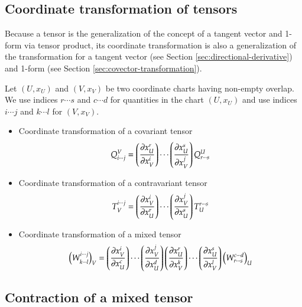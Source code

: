 \documentclass[11pt, a4paper]{book}
\begin{document}
\subsection{Coordinate transformation of tensors}

Because a tensor is the generalization of the concept of a tangent vector and 1-form via
tensor product, its coordinate transformation is also a generalization of the
transformation for a tangent vector (see Section \ref{sec:directional-derivative}) and
1-form (see Section \ref{sec:covector-transformation}).

Let $(U,x_U)$ and $(V,x_V)$ be two coordinate charts having non-empty overlap. We use
indices $r\cdots s$ and $c\cdots d$ for quantities in the chart $(U,x_U)$ and use indices
$i\cdots j$ and $k\cdots l$ for $(V,x_V)$.
\begin{itemize}
\item Coordinate transformation of a covariant tensor
  \begin{equation}
    \label{eq:covariant-tensor-transform}
    Q_{i\cdots j}^V = \left( \frac{\partial x_U^r}{\partial x_V^i} \right) \cdots \left(
      \frac{\partial x_U^s}{\partial x_V^j} \right) Q_{r \cdots s}^U
  \end{equation}
\item Coordinate transformation of a contravariant tensor
  \begin{equation}
    \label{eq:contravariant-tensor-transform}
    T_V^{i \cdots j} = \left( \frac{\partial x_V^i}{\partial x_U^r} \right) \cdots \left(
      \frac{\partial x_V^j}{\partial x_U^s} \right) T_U^{r \cdots s}
  \end{equation}
\item Coordinate transformation of a mixed tensor
  \begin{equation}
    \label{eq:mixed-tensor-transform}
    \left( W^{i \cdots j}_{k \cdots l} \right)_V = \left( \frac{\partial x_V^i}{\partial x_U^c} \right)
    \cdots \left( \frac{\partial x_V^j}{\partial x_U^d} \right) \left( \frac{\partial
        x_U^r}{\partial x_V^k} \right) \cdots \left( \frac{\partial x_U^s}{\partial x_V^l}
    \right) \left( W^{c \cdots d}_{r \cdots s} \right)_U
  \end{equation}
\end{itemize}

\subsection{Contraction of a mixed tensor}
\end{document}
